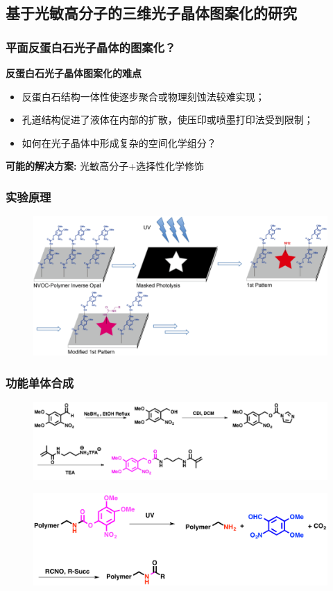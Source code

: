 \documentclass{beamer}
\begin{document}
\subsection{基于光敏高分子的三维光子晶体图案化的研究}
\begin{frame}
  \frametitle{平面反蛋白石光子晶体的图案化？}
  \textcolor{tsinghua}{\textbf{反蛋白石光子晶体图案化的难点}}
  \begin{itemize}[<+-| alert@+>]
    \item
    反蛋白石结构一体性使逐步聚合或物理刻蚀法较难实现；
    \item
    孔道结构促进了液体在内部的扩散，使压印或喷墨打印法受到限制；
    \item
    如何在光子晶体中形成复杂的空间化学组分？
  \end{itemize}
  \pause
  \textcolor{tsinghua}{\textbf{可能的解决方案:}}
  \pause
  光敏高分子+选择性化学修饰
\end{frame}

\begin{frame}
  \frametitle{实验原理}
  \begin{figure}[t]
    \centering
    \includegraphics[width=0.90\linewidth]{figures/scheme-2D-pattern.png}
  \end{figure}
\end{frame}

\begin{frame}
  \frametitle{功能单体合成}
  \begin{figure}[h]
    \centering
    \includegraphics[width=0.95\linewidth]{figures/synth-ch2.png}
  \end{figure}
  \vfill
  \begin{figure}[h]
    \centering
    \includegraphics[width=0.80\linewidth]{figures/uvlabile-scheme.png}
  \end{figure}
\end{frame}
\end{document}
